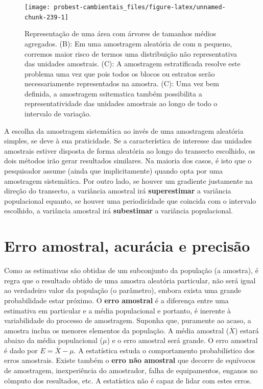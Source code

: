 \documentclass[
]{book}
\begin{document}
\begin{figure}

{\centering \texttt{[image: probest-cambientais\_files/figure-latex/unnamed-chunk-239-1]} 

}

\caption{Representação de uma área com árvores de tamanhos médios agregados. (B): Em uma amostragem aleatória de com n pequeno, corremos maior risco de termos uma distribuição não representativa das unidades amostrais. (C): A amostragem estratificada resolve este problema uma vez que pois todos os blocos ou estratos serão necessariamente representados na amostra. (C): Uma vez bem definida, a amostragem ssitematica também possibilita a representatividade das unidades amostrais ao longo de todo o intervalo de variação.}\label{fig:unnamed-chunk-239}
\end{figure}

A escolha da amostragem sistemática ao invés de uma amostragem aleatória simples, se deve à sua praticidade. Se a característica de interesse das unidades amostrais estiver disposta de forma aleatória ao longo do transecto escolhido, os dois métodos irão gerar resultados similares. Na maioria dos casos, é isto que o pesquisador assume (ainda que implicitamente) quando opta por uma amostragem sistemática. Por outro lado, se houver um gradiente justamente na direção do transecto, a variância amostral irá \textbf{superestimar} a variância populacional equanto, se houver uma periodicidade que coincida com o intervalo escolhido, a variância amostral irá \textbf{subestimar} a variância populacional.

\hypertarget{erro-amostral-acuruxe1cia-e-precisuxe3o}{%
\section{Erro amostral, acurácia e precisão}\label{erro-amostral-acuruxe1cia-e-precisuxe3o}}

Como as estimativas são obtidas de um subconjunto da população (a amostra), é regra que o resultado obtido de uma amostra aleatória particular, não será igual ao verdadeiro valor da população (o parâmetro), embora exista uma grande probabilidade estar próximo. O \textbf{erro amostral} é a diferença entre uma estimativa em particular e a média populacional e portanto, é inerente à variabilidade do processo de amostragem. Suponha que, puramente ao acaso, a amostra inclua os menores elementos da população. A média amostral (\(\overline{X}\)) estará abaixo da média populacional (\(\mu\)) e o erro amostral será grande. O erro amostral é dado por \(E = \overline{X} - \mu\). A estatística estuda o comportamento probabilístico dos erros amostrais. Existe também o \textbf{erro não amostral} que decorre de equívocos de amostragem, inexperiência do amostrador, falha de equipamentos, enganos no cômputo dos resultados, etc. A estatística não é capaz de lidar com estes erros.
\end{document}
